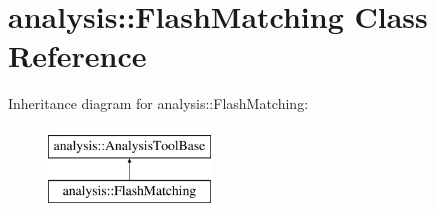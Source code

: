 \hypertarget{classanalysis_1_1FlashMatching}{\section{analysis\-:\-:Flash\-Matching Class Reference}
\label{classanalysis_1_1FlashMatching}
}
Inheritance diagram for analysis\-:\-:Flash\-Matching\-:\begin{figure}[H]
\begin{center}
\leavevmode
\includegraphics[height=2.000000cm]{classanalysis_1_1FlashMatching}
\end{center}
\end{figure}
